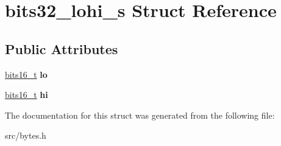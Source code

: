 \hypertarget{structbits32__lohi__s}{}\section{bits32\+\_\+lohi\+\_\+s Struct Reference}
\label{structbits32__lohi__s}
\subsection*{Public Attributes}
\begin{DoxyCompactItemize}
\item 
\hypertarget{structbits32__lohi__s_a2bb6689fada2f0b307c3598ae2240cda}{}\label{structbits32__lohi__s_a2bb6689fada2f0b307c3598ae2240cda} 
\hyperlink{unionbits16__s}{bits16\+\_\+t} {\bfseries lo}
\item 
\hypertarget{structbits32__lohi__s_a6c46dfbcf186ea55f520cd63aa043e32}{}\label{structbits32__lohi__s_a6c46dfbcf186ea55f520cd63aa043e32} 
\hyperlink{unionbits16__s}{bits16\+\_\+t} {\bfseries hi}
\end{DoxyCompactItemize}


The documentation for this struct was generated from the following file\+:\begin{DoxyCompactItemize}
\item 
src/bytes.\+h\end{DoxyCompactItemize}

